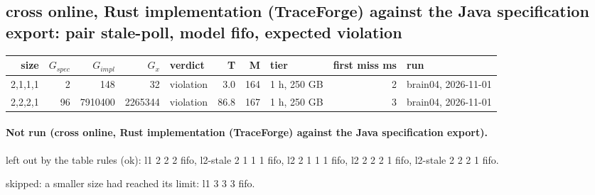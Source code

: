 \documentclass[10pt]{article}
\begin{document}
\subsection*{cross online, Rust implementation (TraceForge) against the Java specification export: pair \textsf{stale-poll}, model fifo, expected violation}
\begin{longtable}{@{}rrrrlrrlrl@{}}
\toprule
size & $G_{\mathit{spec}}$ & $G_{\mathit{impl}}$ & $G_x$ & verdict & T & M & tier & first miss ms & run \\
\midrule
\endhead
\color{red} 2,1,1,1 & 2 & 148 & 32 & violation & 3.0 & 164 & 1 h, 250 GB & 2 & brain04, 2026-11-01 \\
\color{red} 2,2,2,1 & 96 & 7910400 & 2265344 & violation & 86.8 & 167 & 1 h, 250 GB & 3 & brain04, 2026-11-01 \\
\bottomrule
\end{longtable}
\paragraph{Not run (cross online, Rust implementation (TraceForge) against the Java specification export).}
left out by the table rules (ok): l1 2 2 2 fifo, l2-stale 2 1 1 1 fifo, l2 2 1 1 1 fifo, l2 2 2 2 1 fifo, l2-stale 2 2 2 1 fifo.\par
skipped: a smaller size had reached its limit: l1 3 3 3 fifo.\par
\end{document}
